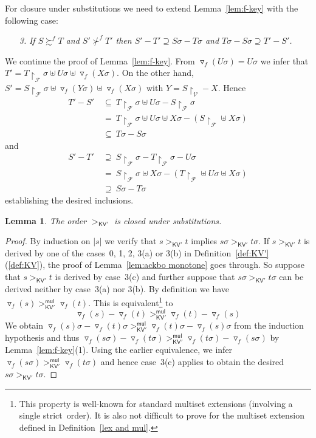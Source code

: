 \documentclass{tlp}
\newcommand{\qed}{\hspace*{1em}\hbox{\proofbox}}
\newtheorem{lemma}[theorem]{Lemma}
\newcommand{\tf}[1]{{\triangledown_{\!#1}}}
\newcommand{\m}[1]{\mathsf{#1}}
\newcommand{\mc}[1]{\mathcal{#1}}
\newcommand{\mr}[1]{\mathrm{#1}}
\newcommand{\mul}{\m{mul}}
\newcommand{\FF}{\mc{F}}
\newcommand{\VV}{\mc{V}}
\newcommand{\KVC}{\mr{\m{KV'}}}
\newcommand{\proper}{proper}
\renewcommand{\proper}{strict}
\newcommand{\GS}{\mathrel{\succsim}}
\newcommand{\NGT}{\mathrel{\nsucc}}
\begin{document}
For closure under substitutions we need to extend 
Lemma~\ref{lem:f-key} with the following case:
\begin{enumerate}
\item[\textit{3.}]
\textit{If $S \GS^f T$ and $S' \NGT^f T'$ then
$S' - T' \supseteq S\sigma - T\sigma$ and 
$T\sigma - S\sigma \supseteq T' - S'$.}
\end{enumerate}

\begin{proof*}
We continue the proof of Lemma~\ref{lem:f-key}.
From $\tf{f}(U\sigma) = U\sigma$ we infer that
$T' = T{\restriction}_\FF\sigma \uplus U\sigma \uplus \tf{f}(X\sigma)$.
On the other hand,
$S' = S{\restriction}_\FF\sigma \uplus \tf{f}(Y\sigma) \uplus
\tf{f}(X\sigma)$ with $Y = S{\restriction}_\VV - X$.
Hence
\begin{align*}
T' - S'~ &\subseteq~
T{\restriction}_\FF\sigma \uplus U\sigma - S{\restriction}_\FF\sigma \\
&=~
T{\restriction}_\FF\sigma \uplus U\sigma \uplus X\sigma -
(S{\restriction}_\FF \uplus X\sigma) \\
&\subseteq~
T\sigma - S\sigma
\end{align*}
and
\begin{align*}
S' - T'~ &\supseteq~
S{\restriction}_\FF\sigma - T{\restriction}_\FF\sigma - U\sigma \\
&=~
S{\restriction}_\FF\sigma \uplus X\sigma -
(T{\restriction}_\FF \uplus U\sigma \uplus X\sigma) \\
&\supseteq~
S\sigma - T\sigma
\end{align*}
establishing the desired inclusions. \qed
\end{proof*}

\begin{lemma}
\label{kvd-stab}
The order $>_\KVC$ is closed under substitutions.
\end{lemma}

\begin{proof}
By induction on $|s|$ we verify that $s >_\KVC t$ implies 
$s\sigma >_\KVC t\sigma$.
If $s >_\KVC t$ is derived by one of the cases~0, 1, 2, 3(a) or 3(b)
in Definition~\ref{def:KV'}
(\ref{def:KV}),
the proof of Lemma~\ref{lem:ackbo monotone} goes through.
So suppose that $s >_\KVC t$ is derived by case~3(c)
and 
further suppose that
$s\sigma >_\KVC t\sigma$ can be derived neither by case~3(a) nor 3(b).
By definition we have
$\tf{f}(s) >_\KVC^\mul \tf{f}(t)$. This is equivalent\footnote{This property is well-known for standard multiset extensions (involving a
single \proper\ order). It is also not difficult to prove for the
multiset extension defined in Definition~\ref{lex and mul}.}
to
\[
\tf{f}(s) - \tf{f}(t) >_\KVC^\mul \tf{f}(t) - \tf{f}(s)
\]
We obtain $\tf{f}(s)\sigma - \tf{f}(t)\sigma >_\KVC^\mul
\tf{f}(t)\sigma - \tf{f}(s)\sigma$ from the induction hypothesis and thus
$\tf{f}(s\sigma) - \tf{f}(t\sigma) >_\KVC^\mul
\tf{f}(t\sigma) - \tf{f}(s\sigma)$ by 
Lemma~\ref{lem:f-key}(1).
Using the earlier equivalence, we infer
$\tf{f}(s\sigma) >_\KVC^\mul \tf{f}(t\sigma)$ and hence case~3(c)
applies to obtain the desired
$s\sigma >_\KVC t\sigma$.
\end{proof}
\end{document}
